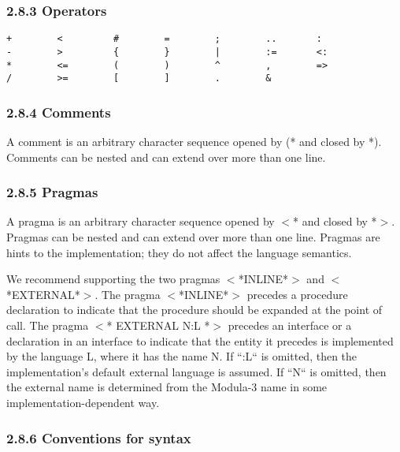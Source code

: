 \documentclass[10pt]{article}
\begin{document}
 
\subsubsection*{2.8.3 Operators}


 
\begin{verbatim}
+        <         #        =        ;        ..       :
-        >         {        }        |        :=       <:
*        <=        (        )        ^        ,        =>
/        >=        [        ]        .        &
\end{verbatim}



 
\subsubsection*{2.8.4 Comments}


  A comment is an arbitrary character sequence opened by (* and closed by *). Comments can be nested and can extend over more than one line. 


 
\subsubsection*{2.8.5 Pragmas}


  A pragma is an arbitrary character sequence opened by $<$* and closed by *$>$. Pragmas can be nested and can extend over more than one line. Pragmas are hints to the implementation; they do not affect the language semantics. 


 We recommend supporting the two pragmas $<$*INLINE*$>$ and $<$*EXTERNAL*$>$. The pragma $<$*INLINE*$>$ precedes a procedure declaration to indicate that the procedure should be expanded at the point of call. The pragma $<$* EXTERNAL N:L *$>$ precedes an interface or a declaration in an interface to indicate that the entity it precedes is implemented by the language L, where it has the name N. If ``:L`` is omitted, then the implementation's default external language is assumed. If ``N`` is omitted, then the external name is determined from the Modula-3 name in some implementation-dependent way. 


 
\subsubsection*{2.8.6 Conventions for syntax}
\end{document}
